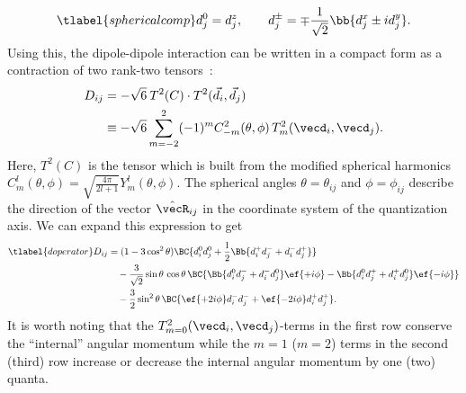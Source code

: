 \begin{align} \tlabel{sphericalcomp}
d^0_j = d^z_j, \qquad d_j^\pm = \mp\frac{1}{\sqrt{2}}\bb{d_j^x\pm i d_j^y}.
\end{align}
Using this, the dipole-dipole interaction can be written in a compact form as a contraction of two rank-two tensors~\cite{Brown2003}:
\begin{align}
    D_{ij} &= -\sqrt{6} \: T^2(C)\cdot T^2(\vec{d}_i,\vec{d}_j)\\
           &\equiv -\sqrt{6}  \sum_{m=-2}^{2} (-1)^m C^2_{-m}(\theta,\phi) \, T^2_m(\vecd_i,\vecd_j).
\end{align}
Here, $T^2(C)$ is the tensor which is built from the modified spherical harmonics $C^l_m(\theta,\phi)=\sqrt{\frac{4\pi}{2l+1}} Y^l_m(\theta,\phi)$. The spherical angles $\theta = \theta_{ij}$ and $\phi = \phi_{ij}$ describe the direction of the vector $\hat{\vecR}_{ij}$ in the coordinate system of the quantization axis.
We can expand this expression to get
\begin{align}\tlabel{doperator}
    D_{ij} &= (1-3\cos^2 \theta) \BC{ d_i^0 d_j^0 + \frac{1}{2}\Bb{d_i^+ d_j^- + d_i^- d_j^+} } \\
           &\quad -\frac{3}{\sqrt{2}}\sin\theta \,\cos\theta\, \BC{ \Bb{ d_i^0 d_j^- + d_i^- d_j^0 } \ef{+i\phi} - \Bb{ d_i^0 d_j^+ + d_i^+ d_j^0 } \ef{-i\phi} } \\
           &\quad -\frac{3}{2}\sin^2\theta \, \BC{ \ef{+2i\phi} d_i^- d_j^- + \ef{-2i\phi} d_i^+ d_j^+ }.
\end{align}
It is worth noting that the $T^2_{m=0}(\vecd_i, \vecd_j)$-terms in the first row conserve the ``internal'' angular momentum while the $m=1$ ($m=2$) terms in the second (third) row increase or decrease the internal angular momentum by one (two) quanta.

